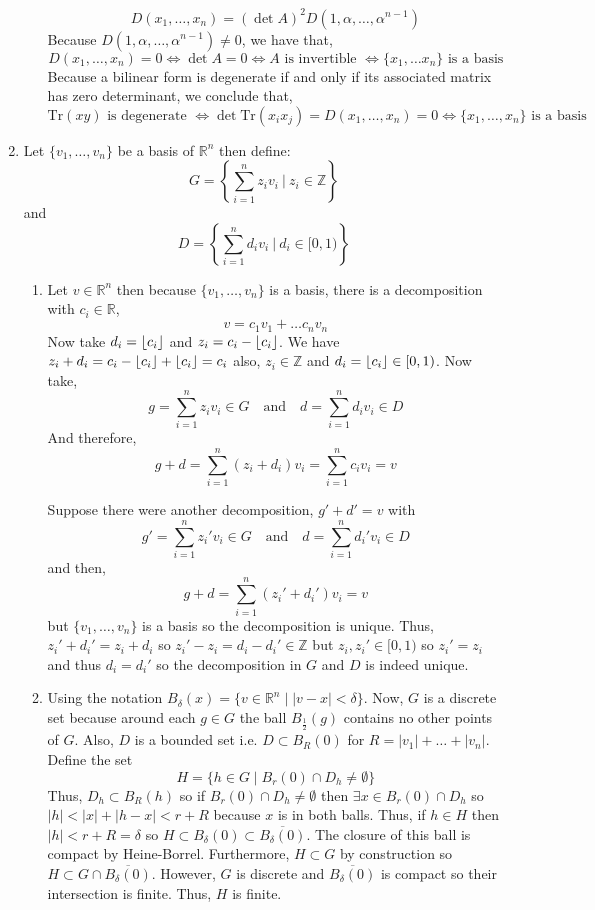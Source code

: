 \documentclass[12pt]{extarticle}
\DeclarePairedDelimiter{\floor}{\lfloor}{\rfloor}
\newcommand{\Z}{\mathbb{Z}}
\newcommand{\ball}[2]{B_{#1} \! \left(#2 \right)}
\newcommand{\R}{\mathbb{R}}
\newcommand{\tr}[1]{\mathrm{Tr} \! \left(#1\right)}
\begin{document}
\begin{enumerate}
\begin{enumerate}
\[D(x_1, \dots, x_n) = (\det{A})^2 D(1, \alpha, \dots, \alpha^{n-1})\]
Because $D(1, \alpha, \dots, \alpha^{n-1}) \neq 0$, we have that,
\[D(x_1, \dots, x_n) = 0 \iff \det{A} = 0 \iff A \text{ is invertible } \iff \{x_1, \dots x_n\} \text{ is a basis}\] 
Because a bilinear form is degenerate if and only if its associated matrix has zero determinant, we conclude that, \[\tr{xy}  \text{ is degenerate } \iff \det{\tr{x_i x_j}} = D(x_1, \dots, x_n) = 0  \iff \{x_1, \dots, x_n\} \text{ is a basis}\] 
\end{enumerate}

\item Let $\{v_1, \dots, v_n \}$ be a basis of $\R^n$ then define:
\[G = \left\{ \sum_{i = 1}^n z_i v_i \: \Big| \: z_i \in \Z \right\}\]
and 
\[D = \left\{ \sum_{i = 1}^n d_i v_i \: \Big| \: d_i \in [0, 1) \right\}\]
\begin{enumerate}
\item Let $v \in \R^n$ then because $\{v_1, \dots, v_n \}$ is a basis, there is a decomposition with $c_i \in \R$, \[v = c_1 v_1 + \dots c_n v_n\] Now take $d_i = \floor{c_i}$ and $z_i = c_i - \floor{c_i}$. We have $z_i + d_i = c_i - \floor{c_i} + \floor{c_i} = c_i$ also, $z_i \in \Z$ and $d_i = \floor{c_i} \in [0, 1)$. Now take, \[g = \sum_{i = 1}^n z_i v_i \in G \quad \text{and} \quad d = \sum_{i = 1}^n d_i v_i \in D\]
And therefore, 
\[ g + d = \sum_{i = 1}^n (z_i + d_i) v_i = \sum_{i = 1}^n c_i v_i = v\] 

Suppose there were another decomposition, $g' + d' = v$ with \[g' = \sum_{i = 1}^n z_i' v_i \in G \quad \text{and} \quad d = \sum_{i = 1}^n d_i' v_i \in D\] and then,
\[ g + d = \sum_{i = 1}^n (z_i' + d_i') v_i = v\] but $\{v_1, \dots, v_n \}$ is a basis so the decomposition is unique. Thus, $z_i' + d_i' = z_i + d_i$ so $z_i' - z_i = d_i - d_i' \in \Z$ but $z_i, z_i' \in [0, 1)$ so $z_i' = z_i$ and thus $d_i = d_i'$ so the decomposition in $G$ and $D$ is indeed unique. 

\item Using the notation $\ball{\delta}{x} = \{ v \in \R^n \mid |v - x| < \delta \}$. Now, $G$ is a discrete set because around each $g \in G$ the ball $\ball{\frac{1}{2}}{g}$ contains no other points of $G$. Also, $D$ is a bounded set i.e. $D \subset \ball{R}{0}$ for $R = |v_1| + \dots + |v_n|$. Define the set \[H = \{ h \in G \mid \ball{r}{0} \cap D_h \neq \emptyset \}\]
Thus, $D_h \subset \ball{R}{h}$ so if $\ball{r}{0} \cap D_h \neq \emptyset$ then $\exists x \in \ball{r}{0} \cap D_h$ so $|h| < |x| + |h - x| < r + R$ because $x$ is in both balls. Thus, if $h \in H$ then $|h| < r + R = \delta$ so $H \subset \ball{\delta}{0} \subset \overline{\ball{\delta}{0}}$. The closure of this ball is compact by Heine-Borrel. Furthermore, $H \subset G$ by construction so $H \subset G \cap \overline{\ball{\delta}{0}}$. However, $G$ is discrete and $\overline{\ball{\delta}{0}}$ is compact so their intersection is finite. Thus, $H$ is finite. 
\end{enumerate}

\end{enumerate}
\end{document}
